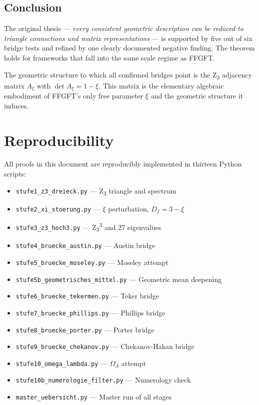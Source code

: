 \subsection{Conclusion}

\begin{conclusionBox}
The original thesis --- \emph{every consistent geometric description can be reduced to triangle connections and matrix representations} --- is supported by five out of six bridge tests and refined by one clearly documented negative finding. The theorem holds for frameworks that fall into the same scale regime as FFGFT.

The geometric structure to which all confirmed bridges point is the Z\textsubscript{3} adjacency matrix \(A_\xi\) with \(\det A_\xi = 1 - \xi\). This matrix is the elementary algebraic embodiment of FFGFT's only free parameter \(\xi\) and the geometric structure it induces.
\end{conclusionBox}

\section*{Reproducibility}

All proofs in this document are reproducibly implemented in thirteen Python scripts:

\begin{itemize}
\item \texttt{stufe1\_z3\_dreieck.py} --- Z\textsubscript{3} triangle and spectrum
\item \texttt{stufe2\_xi\_stoerung.py} --- \(\xi\) perturbation, \(D_f = 3 - \xi\)
\item \texttt{stufe3\_z3\_hoch3.py} --- Z\textsubscript{3}\textsuperscript{3} and 27 eigenvalues
\item \texttt{stufe4\_bruecke\_austin.py} --- Austin bridge
\item \texttt{stufe5\_bruecke\_moseley.py} --- Moseley attempt
\item \texttt{stufe5b\_geometrisches\_mittel.py} --- Geometric mean deepening
\item \texttt{stufe6\_bruecke\_tekermen.py} --- Teker bridge
\item \texttt{stufe7\_bruecke\_phillips.py} --- Phillips bridge
\item \texttt{stufe8\_bruecke\_porter.py} --- Porter bridge
\item \texttt{stufe9\_bruecke\_chekanov.py} --- Chekanov-Hakan bridge
\item \texttt{stufe10\_omega\_lambda.py} --- \(\Omega_\Lambda\) attempt
\item \texttt{stufe10b\_numerologie\_filter.py} --- Numerology check
\item \texttt{master\_uebersicht.py} --- Master run of all stages
\end{itemize}

